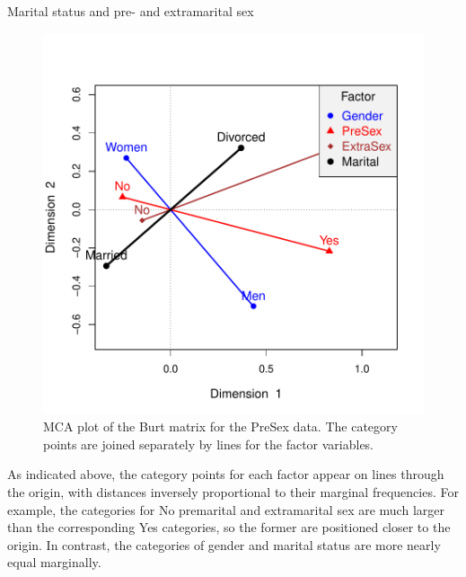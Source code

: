 \documentclass[11pt]{book}
\renewenvironment{knitrout}{\small\renewcommand{\baselinestretch}{.85}}{} %
\begin{document}
\begin{Example}[marital3]{Marital status and pre- and extramarital sex}
\begin{knitrout}
\begin{kframe}
\begin{alltt}
\hlstd{(}\hlstd{,} \hlstd{=}\hlstd{(}\hlstd{,} \hlstd{,} \hlstd{,} \hlstd{),}
  \hlstd{=}\hlstd{,} \hlstd{=}\hlstd{,}
          \hlstd{=}\hlopt{:}\hlstd{,}
        \hlstd{=}\hlstd{,} \hlstd{=}\hlstd{)}
\end{alltt}
\end{kframe}\begin{figure}[!htb]


\centerline{\includegraphics[width=.8\textwidth]{ch06/fig/presex-mca-plot} }

\caption[MCA plot of the Burt matrix for the PreSex data]{MCA plot of the Burt matrix for the PreSex data. The category points are joined separately by lines for the factor variables.\label{fig:presex-mca-plot}}
\end{figure}


\end{knitrout}
As indicated above, the category points for each factor appear on 
lines through the origin, with distances inversely proportional to their
marginal frequencies. For example, the categories for No premarital and extramarital
sex are much larger than the corresponding Yes categories, so the former are
positioned closer to the origin.  In contrast, the categories of gender and
marital status are more nearly equal marginally.


\end{Example}
\end{document}
